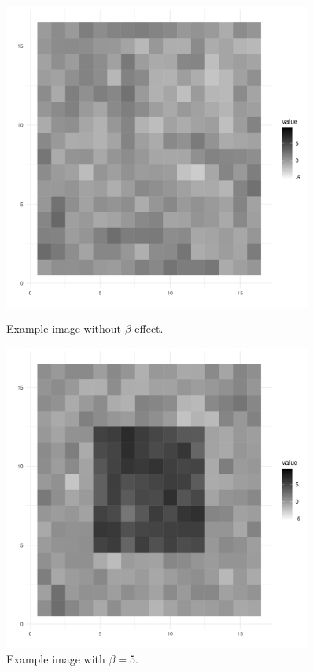 \documentclass[12pt]{article}
\begin{document}
\begin{figure}[H]
  \centering
  \begin{minipage}[b]{0.45\textwidth}
    \centering
    \includegraphics[width=0.9\textwidth]{../Figures/ex_image_5c.png}
    \caption{Example image without \(\beta\) effect.}
    \label{fig:image1}
  \end{minipage}\hfill
  \begin{minipage}[b]{0.45\textwidth}
    \centering
    \includegraphics[width=0.9\textwidth]{../Figures/ex_image_5.png}
    \caption{Example image with \(\beta = 5\).}
    \label{fig:image2}
  \end{minipage}


\end{figure}
\end{document}
